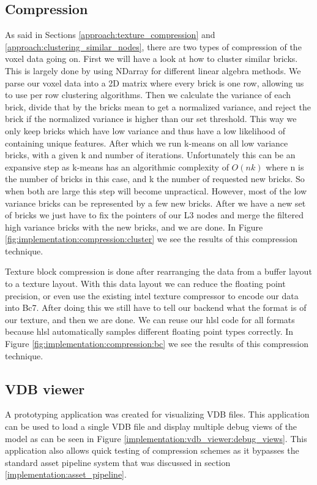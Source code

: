 \subsection{Compression} \label{implementation:compression}
As said in Sections \ref{approach:texture_compression} and \ref{approach:clustering_similar_nodes}, there are two types of compression of the voxel data going on. First we will have a look at how to cluster similar bricks. This is largely done by using NDarray \cite{NDarray} for different linear algebra methods. We parse our voxel data into a 2D matrix where every brick is one row, allowing us to use per row clustering algorithms. Then we calculate the variance of each brick, divide that by the bricks mean to get a normalized variance, and reject the brick if the normalized variance is higher than our set threshold. This way we only keep bricks which have low variance and thus have a low likelihood of containing unique features. After which we run k-means on all low variance bricks, with a given k and number of iterations. Unfortunately this can be an expansive step as k-means has an algorithmic complexity of $O(nk)$ where n is the number of bricks in this case, and k the number of requested new bricks. So when both are large this step will become unpractical. However, most of the low variance bricks can be represented by a few new bricks. After we have a new set of bricks we just have to fix the pointers of our L3 nodes and merge the filtered high variance bricks with the new bricks, and we are done. In Figure \ref{fig:implementation:compression:cluster} we see the results of this compression technique.


Texture block compression is done after rearranging the data from a buffer layout to a texture layout. With this data layout we can reduce the floating point precision, or even use the existing intel texture compressor \cite{ISPCTextureCompressor} to encode our data into Bc7. After doing this we still have to tell our backend what the format is of our texture, and then we are done. We can reuse our hlsl code for all formats because hlsl automatically samples different floating point types correctly.  In Figure \ref{fig:implementation:compression:bc} we see the results of this compression technique.




\subsection{VDB viewer} \label{implementation:vdb_viewer}
A prototyping application was created for visualizing VDB files. This application can be used to load a single VDB file and display multiple debug views of the model as can be seen in Figure \ref{implementation:vdb_viewer:debug_views}. This application also allows quick testing of compression schemes as it bypasses the standard asset pipeline system that was discussed in section \ref{implementation:asset_pipeline}.

